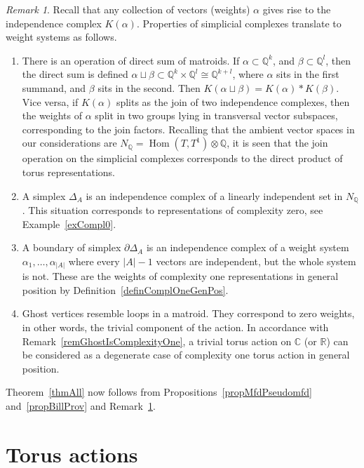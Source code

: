 \documentclass[english,12pt,oneside]{amsproc}
\DeclareMathOperator{\Hom}{Hom} \DeclareMathOperator{\rk}{rk}
\newcommand{\Ro}{\mathbb{R}}
\newcommand{\Co}{\mathbb{C}}
\newcommand{\Qo}{\mathbb{Q}}
\newcommand{\dd}{\partial}
\newcommand{\Nq}{N_\Qo}
\newcounter{stmcounter}[section]
\numberwithin{equation}{section}
\theoremstyle{plain}
\theoremstyle{definition}
\theoremstyle{remark}
\newtheorem{rem}[stmcounter]{Remark}
\begin{document}
\begin{rem}\label{remCorrespondence}
Recall that any collection of vectors (weights) $\alpha$ gives rise to the independence complex $K(\alpha)$. Properties of simplicial complexes translate to weight systems as follows.
\begin{enumerate}
  \item There is an operation of direct sum of matroids. If $\alpha\subset\Qo^k$, and $\beta\subset\Qo^l$, then the direct sum is defined $\alpha\sqcup\beta\subset\Qo^k\times\Qo^l\cong\Qo^{k+l}$, where $\alpha$ sits in the first summand, and $\beta$ sits in the second. Then $K(\alpha\sqcup\beta)=K(\alpha)\ast K(\beta)$. Vice versa, if $K(\alpha)$ splits as the join of two independence complexes, then the weights of $\alpha$ split in two groups lying in transversal vector subspaces, corresponding to the join factors. Recalling that the ambient vector spaces in our considerations are $\Nq=\Hom(T,T^1)\otimes\Qo$, it is seen that the join operation on the simplicial complexes corresponds to the direct product of torus representations.
  \item A simplex $\Delta_A$ is an independence complex of a linearly independent set in $\Nq$. This situation corresponds to representations of complexity zero, see Example~\ref{exCompl0}.
  \item A boundary of simplex $\dd\Delta_A$ is an independence complex of a weight system $\alpha_1,\ldots,\alpha_{|A|}$ where every $|A|-1$ vectors are independent, but the whole system is not. These are the weights of complexity one representations in general position by Definition~\ref{definComplOneGenPos}.
  \item Ghost vertices resemble loops in a matroid. They correspond to zero weights, in other words, the trivial component of the action. In accordance with Remark~\ref{remGhostIsComplexityOne}, a trivial torus action on $\Co$ (or $\Ro$) can be considered as a degenerate case of complexity one torus action in general position.
\end{enumerate}
\end{rem}

Theorem~\ref{thmAll} now follows from Propositions~\ref{propMfdPseudomfd} and~\ref{propBillProv} and Remark~\ref{remCorrespondence}.




\section{Torus actions}\label{secTorusActions}
\end{document}
